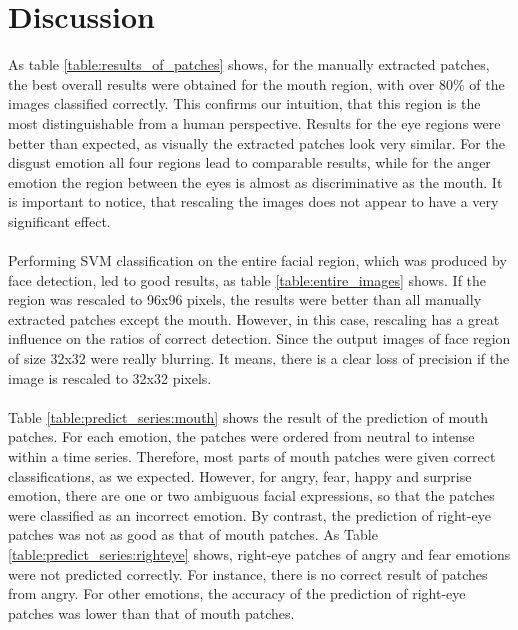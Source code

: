 \section{Discussion}
As table \ref{table:results_of_patches} shows, for the manually extracted patches, the best overall results were obtained for the mouth region, with over 80\% of the images classified correctly.
This confirms our intuition, that this region is the most distinguishable
from a human perspective. Results for the eye regions were better than expected, as visually the extracted patches look very similar. For the disgust emotion all
four regions lead to comparable results, while for the anger emotion the region between the eyes is almost as discriminative as the mouth. It is important to notice, that rescaling the images does not appear to have a very significant effect.
\\
\\
Performing SVM classification on the entire facial region, which was produced by face detection, led to good results, as table \ref{table:entire_images} shows. If the region was rescaled to 96x96 pixels, the results were better than all manually extracted
patches except the mouth. However, in this case, rescaling has a great influence on the ratios of correct detection. Since the output images of face region of size 32x32 were really blurring. It means, there is a clear loss of precision if the image is rescaled to 32x32 pixels. %
\\
\\
Table \ref{table:predict_series:mouth} shows the result of the prediction of mouth patches. For each emotion, the patches were ordered from neutral to intense within a time series. Therefore, most parts of mouth patches were given correct classifications, as we expected. However, for angry, fear, happy and surprise emotion, there are one or two ambiguous facial expressions, so that the patches were classified as an incorrect emotion. By contrast, the prediction of right-eye patches was not as good as that of mouth patches. As Table \ref{table:predict_series:righteye} shows, right-eye patches of angry and fear emotions were not predicted correctly. For instance, there is no correct result of patches from angry. For other emotions, the accuracy of the prediction of right-eye patches was lower than that of mouth patches.
\\
